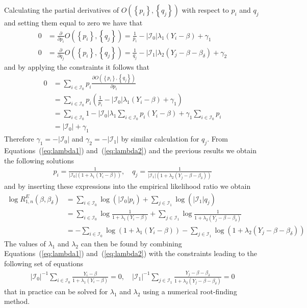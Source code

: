 Calculating the partial derivatives of $O(\left\{p_i\right\}, \left\{q_j\right\})$ with respect to $p_i$ and $q_j$ and setting them equal to zero we have that
\begin{align}
  0 &= \frac{\partial}{\partial p_i}O(\left\{p_i\right\}, \left\{q_j\right\}) = \frac{1}{p_i} - |\mathcal{I}_0|\lambda_1 (Y_i - \beta) + \gamma_1\label{eq:lambda1}\\
  0 &= \frac{\partial}{\partial q_j}O(\left\{p_i\right\}, \left\{q_j\right\}) = \frac{1}{q_j} - |\mathcal{I}_1|\lambda_2 (Y_j - \beta - \beta_\delta) + \gamma_2\label{eq:lambda2}
\end{align}
and by applying the constraints it follows that
\begin{align*}
  0 &= \sum_{i \in \mathcal{I}_0} p_i \frac{\partial O(\left\{p_i\right\}, \left\{q_j\right\})}{\partial p_i}\\
  &= \sum_{i \in \mathcal{I}_0} p_i\left(\frac{1}{p_i} - |\mathcal{I}_0|\lambda_1 (Y_i - \beta) + \gamma_1\right)\nonumber\\
  &= \sum_{i \in \mathcal{I}_0} 1 - |\mathcal{I}_0| \lambda_1\sum_{i \in \mathcal{I}_0} p_i (Y_i - \beta) + \gamma_1 \sum_{i \in \mathcal{I}_0} p_i\nonumber\\
  &= |\mathcal{I}_0| + \gamma_1\nonumber
\end{align*}
Therefore $\gamma_1 = -|\mathcal{I}_0|$ and $\gamma_2 = -|\mathcal{I}_1|$ by similar calculation for $q_j$. From Equations~(\ref{eq:lambda1}) and~(\ref{eq:lambda2}) and the previous results we obtain the following solutions
\begin{align}
  p_i = \frac{1}{|\mathcal{I}_0|(1 + \lambda_1 (Y_i - \beta))}, \quad q_j = \frac{1}{|\mathcal{I}_1|(1 + \lambda_2 (Y_j - \beta - \beta_\delta))}
\end{align}
and by inserting these expressions into the empirical likelihood ratio we obtain
\begin{align}
\log R_{1,n}^E(\beta, \beta_\delta) &= \sum_{i \in \mathcal{I}_0} \log(|\mathcal{I}_0| p_i) + \sum_{j \in \mathcal{I}_1}\log(|\mathcal{I}_1| q_j)\\
&= \sum_{i \in \mathcal{I}_0}\log \frac{1}{1 + \lambda_1 (Y_i - \beta)} + \sum_{j \in \mathcal{I}_1}\log \frac{1}{1 + \lambda_2 (Y_j - \beta - \beta_\delta)}\nonumber\\
&= -\sum_{i \in \mathcal{I}_0}\log \left(1 + \lambda_1 (Y_i - \beta)\right) - \sum_{j \in \mathcal{I}_1}\log\left(1 + \lambda_2 (Y_j - \beta - \beta_\delta)\right)\nonumber
\end{align}
The values of $\lambda_1$ and $\lambda_2$ can then be found by combining Equations~(\ref{eq:lambda1}) and~(\ref{eq:lambda2}) with the constraints leading to the following set of equations
\begin{align}
  |\mathcal{I}_0|^{-1}\sum_{i \in \mathcal{I}_0} \frac{Y_i - \beta}{1 + \lambda_1 (Y_i - \beta)} = 0, \quad |\mathcal{I}_1|^{-1}\sum_{j \in \mathcal{I}_1}\frac{Y_j - \beta - \beta_\delta}{1 + \lambda_2 (Y_j - \beta - \beta_\delta)} = 0
\end{align}
that in practice can be solved for $\lambda_1$ and $\lambda_2$ using a numerical root-finding method.

